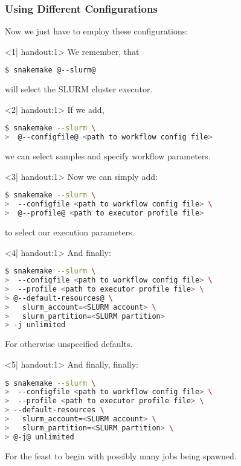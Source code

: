 \begin{frame}[fragile]
  \frametitle{Using Different Configurations}
  Now we just have to employ these configurations:\newline
  \begin{onlyenv}<1| handout:1>
    We remember, that 
    \begin{lstlisting}[language=Bash, style=Shell]
$ snakemake @--slurm@
    \end{lstlisting}
    will select the SLURM cluster executor.\vfill
  \end{onlyenv}
  \begin{onlyenv}<2| handout:1>
    If we add,
    \begin{lstlisting}[language=Bash, style=Shell]
$ snakemake --slurm \
>  @--configfile@ <path to workflow config file>
    \end{lstlisting}
    we can select samples and specify workflow parameters.\vfill
  \end{onlyenv}
  \begin{onlyenv}<3| handout:1>
   Now we can simply add:
       \begin{lstlisting}[language=Bash, style=Shell]
$ snakemake --slurm \
>  --configfile <path to workflow config file> \
>  @--profile@ <path to executor profile file> 
    \end{lstlisting}
    to select our execution parameters.\vfill
  \end{onlyenv}
  \begin{onlyenv}<4| handout:1>
   And finally:
       \begin{lstlisting}[language=Bash, style=Shell]
$ snakemake --slurm \
>  --configfile <path to workflow config file> \
>  --profile <path to executor profile file> \
> @--default-resources@ \ 
>   slurm_account=<SLURM account> \
>   slurm_partition=<SLURM partition> 
> -j unlimited
    \end{lstlisting}
    For otherwise unspecified defaults.
    \vfill
  \end{onlyenv}
  \begin{onlyenv}<5| handout:1>
   And finally, finally:
       \begin{lstlisting}[language=Bash, style=Shell]
$ snakemake --slurm \
>  --configfile <path to workflow config file> \
>  --profile <path to executor profile file> \
> --default-resources \ 
>   slurm_account=<SLURM account> \
>   slurm_partition=<SLURM partition> \
> @-j@ unlimited
    \end{lstlisting}
    For the feast to begin with possibly many jobs being spawned.
    \vfill
  \end{onlyenv}
\end{frame}

